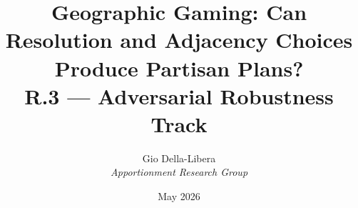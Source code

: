 \documentclass[12pt]{article}
\title{\textbf{Geographic Gaming: Can Resolution and Adjacency Choices\\
Produce Partisan Plans?}\\[0.4em]
\large R.3 --- Adversarial Robustness Track}
\author{Gio Della-Libera \\ \textit{Apportionment Research Group}}
\date{May 2026}
\begin{document}
\maketitle
\begin{abstract}\end{abstract}






\end{document}
